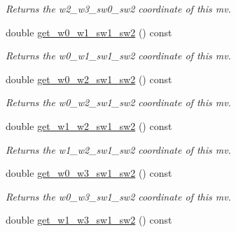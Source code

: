 \begin{DoxyCompactItemize}
\begin{DoxyCompactList}\small\item\em Returns the w2\-\_\-w3\-\_\-sw0\-\_\-sw2 coordinate of this mv. \end{DoxyCompactList}\item 
\hypertarget{classe3ga_1_1mv_a4939b262be28491952a3e438109ce208}{double \hyperlink{classe3ga_1_1mv_a4939b262be28491952a3e438109ce208}{get\-\_\-w0\-\_\-w1\-\_\-sw1\-\_\-sw2} () const }\label{classe3ga_1_1mv_a4939b262be28491952a3e438109ce208}

\begin{DoxyCompactList}\small\item\em Returns the w0\-\_\-w1\-\_\-sw1\-\_\-sw2 coordinate of this mv. \end{DoxyCompactList}\item 
\hypertarget{classe3ga_1_1mv_a7d3d7cbc0f303ea976855d40e9c8fa9d}{double \hyperlink{classe3ga_1_1mv_a7d3d7cbc0f303ea976855d40e9c8fa9d}{get\-\_\-w0\-\_\-w2\-\_\-sw1\-\_\-sw2} () const }\label{classe3ga_1_1mv_a7d3d7cbc0f303ea976855d40e9c8fa9d}

\begin{DoxyCompactList}\small\item\em Returns the w0\-\_\-w2\-\_\-sw1\-\_\-sw2 coordinate of this mv. \end{DoxyCompactList}\item 
\hypertarget{classe3ga_1_1mv_a83476f049709f15cf1b19ed5094ab2e7}{double \hyperlink{classe3ga_1_1mv_a83476f049709f15cf1b19ed5094ab2e7}{get\-\_\-w1\-\_\-w2\-\_\-sw1\-\_\-sw2} () const }\label{classe3ga_1_1mv_a83476f049709f15cf1b19ed5094ab2e7}

\begin{DoxyCompactList}\small\item\em Returns the w1\-\_\-w2\-\_\-sw1\-\_\-sw2 coordinate of this mv. \end{DoxyCompactList}\item 
\hypertarget{classe3ga_1_1mv_ac544c82484165f70d3f51724a7f939b5}{double \hyperlink{classe3ga_1_1mv_ac544c82484165f70d3f51724a7f939b5}{get\-\_\-w0\-\_\-w3\-\_\-sw1\-\_\-sw2} () const }\label{classe3ga_1_1mv_ac544c82484165f70d3f51724a7f939b5}

\begin{DoxyCompactList}\small\item\em Returns the w0\-\_\-w3\-\_\-sw1\-\_\-sw2 coordinate of this mv. \end{DoxyCompactList}\item 
\hypertarget{classe3ga_1_1mv_a2488f89a369ecb6d5e13e5373576473f}{double \hyperlink{classe3ga_1_1mv_a2488f89a369ecb6d5e13e5373576473f}{get\-\_\-w1\-\_\-w3\-\_\-sw1\-\_\-sw2} () const }\label{classe3ga_1_1mv_a2488f89a369ecb6d5e13e5373576473f}


\end{DoxyCompactItemize}
